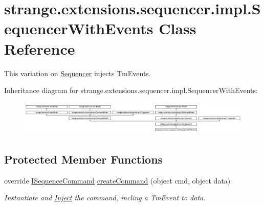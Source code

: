 \hypertarget{classstrange_1_1extensions_1_1sequencer_1_1impl_1_1_sequencer_with_events}{\section{strange.\-extensions.\-sequencer.\-impl.\-Sequencer\-With\-Events Class Reference}
\label{classstrange_1_1extensions_1_1sequencer_1_1impl_1_1_sequencer_with_events}
}


This variation on \hyperlink{classstrange_1_1extensions_1_1sequencer_1_1impl_1_1_sequencer}{Sequencer} injects Tm\-Events.  


Inheritance diagram for strange.\-extensions.\-sequencer.\-impl.\-Sequencer\-With\-Events\-:\begin{figure}[H]
\begin{center}
\leavevmode
\includegraphics[height=1.642229cm]{classstrange_1_1extensions_1_1sequencer_1_1impl_1_1_sequencer_with_events}
\end{center}
\end{figure}
\subsection*{Protected Member Functions}
\begin{DoxyCompactItemize}
\item 
\hypertarget{classstrange_1_1extensions_1_1sequencer_1_1impl_1_1_sequencer_with_events_a5ee050c543c18c73a78b289a90ebcea5}{override \hyperlink{interfacestrange_1_1extensions_1_1sequencer_1_1api_1_1_i_sequence_command}{I\-Sequence\-Command} \hyperlink{classstrange_1_1extensions_1_1sequencer_1_1impl_1_1_sequencer_with_events_a5ee050c543c18c73a78b289a90ebcea5}{create\-Command} (object cmd, object data)}\label{classstrange_1_1extensions_1_1sequencer_1_1impl_1_1_sequencer_with_events_a5ee050c543c18c73a78b289a90ebcea5}

\begin{DoxyCompactList}\small\item\em Instantiate and \hyperlink{class_inject}{Inject} the command, incling a Tm\-Event to data. \end{DoxyCompactList}\end{DoxyCompactItemize}
